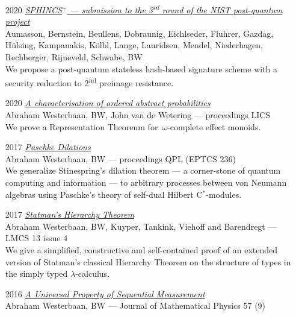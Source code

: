 \documentclass{article}
\newcommand\partitle[1]{\vskip20pt\par\noindent{\textsf{\textbf{#1}}}}
\begin{document}
\partitle{Selected publications}
\begin{itemize}
    \item[2020] \emph{\href{https://sphincs.org/data/sphincs+-round3-specification.pdf}{SPHINCS$^+$ ---
        submission to the 3\textsuperscript{rd} round of the NIST post-quantum project}}\\
    {\footnotesize Aumasson, Bernstein, Beullens, Dobraunig, Eichlseder, Fluhrer,
        Gazdag, H\"ulsing, Kampanakis, K\"olbl, Lange, Lauridsen, Mendel,
        Niederhagen, Rechberger, Rijneveld, Schwabe, BW}\\
    We propose a post-quantum stateless hash-based signature scheme
            with a security reduction to 2\textsuperscript{nd} preimage resistance.
    \item[2020] \emph{\href{https://dl.acm.org/doi/abs/10.1145/3373718.3394742}{A characterisation of ordered abstract probabilities}}\\
    {\footnotesize Abraham Westerbaan, BW, John van de Wetering
            --- proceedings LICS}\\
        We prove a Representation Theorenm for~$\omega$-complete
        effect monoids.
    \item[2017] \emph{\href{http://eptcs.web.cse.unsw.edu.au/paper.cgi?QPL2016.15}{Paschke Dilations}}\\
    {\footnotesize Abraham Westerbaan, BW --- proceedings QPL (EPTCS 236)}\\
    We generalize Stinespring's dilation theorem --- a corner-stone
        of quantum computing and information --- to arbitrary processes
        between von Neumann algebras using Paschke's theory of
        self-dual Hilbert C$^*$-modules.
    \item[2017] \emph{\href{https://lmcs.episciences.org/4089}{Statman's Hierarchy Theorem}}\\
    {\footnotesize Abraham Westerbaan, BW,  Kuyper, Tankink, Viehoff and Barendregt --- LMCS 13 issue 4}\\
    We give a simplified, constructive and self-contained proof
        of an extended version of Statman's classical Hierarchy Theorem
        on the structure of types in the simply typed $\lambda$-calculus.
    \item[2016] \emph{\href{http://scitation.aip.org/content/aip/journal/jmp/57/9/10.1063/1.4961526}{A Universal Property of Sequential Measurement}}\\
    {\footnotesize Abraham Westerbaan, BW ---
    Journal of Mathematical Physics 57 (9)}\\

\end{itemize}
\end{document}
